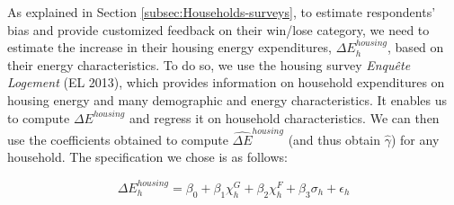 \documentclass[12pt]{article} %
\begin{document}
\begin{appendices}


As explained in Section \ref{subsec:Households-surveys}, to estimate respondents' bias and provide customized feedback on their win/lose category, we need to estimate the increase in their housing energy expenditures, $\Delta E_h^{housing}$, based on their energy characteristics. To do so, we use the housing survey \emph{Enquête Logement} (EL 2013), which provides information on household expenditures on housing energy and many demographic and energy characteristics. It enables us to compute $\Delta E^{housing}$ and regress it on household characteristics. We can then use the coefficients obtained to compute $\widehat{\Delta E}^{housing}$ (and thus obtain $\widehat{\gamma}$) for any household. The specification we chose is as follows:

\begin{equation}
\label{formula_reg_net_gain}
    \Delta E^{housing}_h = \beta_0 + \beta_1 \chi^G_h + \beta_2 \chi^F_h + \beta_3 \sigma_h + \epsilon_h
\end{equation}



\end{appendices}
\end{document}
